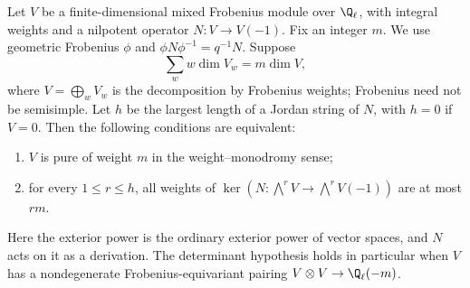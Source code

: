 \begin{lemma}
\label{c:exterior-weight-criterion}
Let $V$ be a finite-dimensional mixed Frobenius module over
$\Q_\ell$, with integral weights and a nilpotent operator
$N:V\to V(-1)$.  Fix an integer $m$.  We use geometric Frobenius $\phi$ and
$\phi N\phi^{-1}=q^{-1}N$.  Suppose
\[
 \sum_w w\dim V_w=m\dim V,
\]
where $V=\bigoplus_wV_w$ is the decomposition by Frobenius
weights; Frobenius need not be semisimple.  Let $h$ be the
largest length of a Jordan string of $N$, with $h=0$ if $V=0$.
Then the following conditions are equivalent:
\begin{enumerate}
\item $V$ is pure of weight $m$ in the weight--monodromy sense;
\item for every $1\leq r\leq h$, all weights of
$\ker(N:\bigwedge^r V\to\bigwedge^r V(-1))$ are at most $rm$.
\end{enumerate}
Here the exterior power is the ordinary exterior power of vector
spaces, and $N$ acts on it as a derivation.  The determinant
hypothesis holds in particular when $V$ has a nondegenerate
Frobenius-equivariant pairing
$V\otimes V\to\Q_\ell(-m)$.
\end{lemma}


